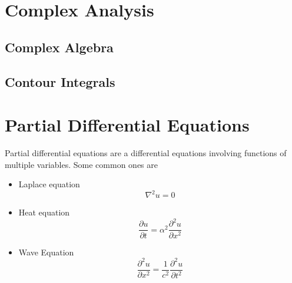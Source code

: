 \documentclass[11pt, fleqn]{article}
\begin{document}
\section{Complex Analysis}
\subsection{Complex Algebra}
\subsection{Contour Integrals}












































\section{Partial Differential Equations}
Partial differential equations are a differential equations involving functions of multiple variables. Some common ones are
\begin{itemize}
    \item Laplace equation
    $$\nabla^2 u=0$$
    \item Heat equation
    $$\frac{\partial u}{\partial t}=\alpha^2\frac{\partial^2u}{\partial x^2}$$
    \item Wave Equation
    $$\frac{\partial^2u}{\partial x^2}=\frac{1}{c^2}\frac{\partial^2 u}{\partial t^2}$$
\end{itemize}
\end{document}
